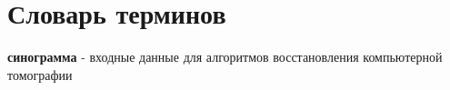 \chapter*{Словарь терминов}             %

\textbf{синограмма} - входные данные для алгоритмов восстановления компьютерной томографии

